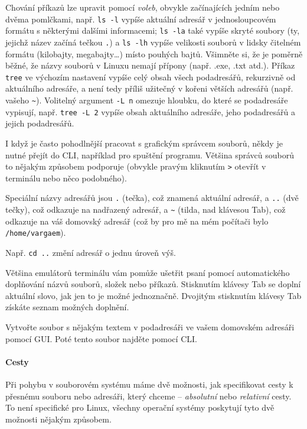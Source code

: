 %
Chování příkazů lze upravit pomocí \emph{voleb}, obvykle začínajících jedním nebo dvěma pomlčkami, např. \verb|ls -l| vypíše aktuální adresář v jednosloupcovém formátu s některými dalšími informacemi; \verb|ls -la| také vypíše skryté soubory (ty, jejichž název začíná tečkou \verb|.|) a \verb|ls -lh| vypíše velikosti souborů v lidsky čitelném formátu (kilobajty, megabajty\ldots) místo pouhých bajtů. Všimněte si, že je poměrně běžné, že názvy souborů v Linuxu nemají přípony (např. .exe, .txt atd.). Příkaz \verb|tree| ve výchozím nastavení vypíše celý obsah všech podadresářů, rekurzivně od aktuálního adresáře, a není tedy příliš užitečný v kořeni větších adresářů (např. vašeho \verb|~|). Volitelný argument \verb|-L n| omezuje hloubku, do které se podadresáře vypisují, např. \verb|tree -L 2| vypíše obsah aktuálního adresáře, jeho podadresářů a jejich podadresářů.

I když je často pohodlnější pracovat s grafickým správcem souborů, někdy je nutné přejít do CLI, například pro spuštění programu. Většina správců souborů to nějakým způsobem podporuje (obvykle pravým kliknutím \verb|>| otevřít v terminálu nebo něco podobného).

Speciální názvy adresářů jsou \verb|.| (tečka), což znamená aktuální adresář, a \verb|..| (dvě tečky), což odkazuje na nadřazený adresář, a \verb|~| (tilda, nad klávesou Tab), což odkazuje na váš domovský adresář (což by pro mě na mém počítači bylo \verb|/home/vargaem|).

Např. \verb|cd ..| změní adresář o jednu úroveň výš.

Většina emulátorů terminálu vám pomůže ušetřit psaní pomocí automatického doplňování názvů souborů, složek nebo příkazů. Stisknutím klávesy Tab se doplní aktuální slovo, jak jen to je možné jednoznačně. Dvojitým stisknutím klávesy Tab získáte seznam možných doplnění.

\begin{exercise}
  Vytvořte soubor s nějakým textem v podadresáři ve vašem domovském adresáři pomocí GUI. Poté tento soubor najděte pomocí CLI.
\end{exercise} 

\paragraph{Cesty} Při pohybu v souborovém systému máme dvě možnosti, jak specifikovat cesty k přesnému souboru nebo adresáři, který chceme -- \emph{absolutní} nebo \emph{relativní} cesty. To není specifické pro Linux, všechny operační systémy poskytují tyto dvě možnosti nějakým způsobem.

